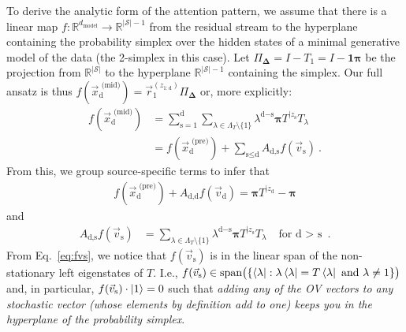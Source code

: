 \documentclass{article}
\theoremstyle{plain}
\theoremstyle{definition}
\theoremstyle{remark}
\newcommand{\stationary}{\boldsymbol{\pi}}
\newcommand{\SSet}{\mathcal{S}}
\begin{document}
To derive the analytic form of the attention pattern, we 
assume that there is a linear map 
$f: \mathbb{R}^{d_\text{model}} \to \mathbb{R}^{|\SSet|-1}$
from the residual stream to the 
hyperplane containing the
probability simplex over the hidden states of a minimal generative model of the data (the 2-simplex in this case).
Let $\Pi_{\boldsymbol{\Delta}} = I - T_1 = I - \boldsymbol{1} \stationary$ be the projection from 
$\mathbb{R}^{|\SSet|}$
to the hyperplane 
$\mathbb{R}^{|\SSet|-1}$
containing the simplex.
Our full ansatz is thus
$f(\vec{x}_\text{d}^\text{ (mid)}) = \vec{r}_1^{(z_{1:\text{d}})}\Pi_{\boldsymbol{\Delta}}$ or, more explicitly:
\begin{align}
f(\vec{x}_\text{d}^\text{ (mid)}) &= \sum_{\text{s}=1}^{\text{d}} 
     \sum_{\lambda \in \Lambda_T \setminus \{ 1 \}} \lambda^{\text{d}-\text{s}} \stationary
     T^{|z_{\text{s}}} 
     T_\lambda \\
&= f(\vec{x}_\text{d}^\text{ (pre)}) + \sum_{\text{s} \le \text{d}} A_{\text{d}, \text{s}} f(\vec{v}_\text{s}) ~.
\end{align}
From this, we 
group source-specific terms to
infer that 
\begin{align}
f(\vec{x}_\text{d}^\text{ (pre)}) + A_{\text{d}, \text{d}} f(\vec{v}_\text{d}) 
= \stationary T^{|z_{\text{d}}} - \stationary
\label{eq:DiagonalAttention}
\end{align}
and
%
\begin{align}
A_{\text{d}, \text{s}} f(\vec{v}_\text{s}) &= \sum_{\lambda \in \Lambda_T \setminus \{ 1 \}} \lambda^{\text{d}-\text{s}} \stationary
     T^{|z_{\text{s}}} 
     T_\lambda
     &\text{for d $>$ s}  ~.
\label{eq:fvs}
\end{align}
From Eq.~\eqref{eq:fvs}, 
we notice that $f(\vec{v}_\text{s})$ is in the linear span of the non-stationary left eigenstates of $T$.
I.e., $f(\vec{v}_\text{s}) \in \text{span}\bigl( \{ \bra{\lambda} : \lambda \bra{\lambda} = T \bra{\lambda} \text{ and } \lambda \neq 1 \} \bigr)$ and, in particular, $f(\vec{v}_\text{s}) \cdot \ket{1} = 0$ such that \emph{adding any of the OV vectors to any stochastic vector (whose elements by definition add to one) keeps you in the hyperplane of the  probability simplex}.


\end{document}
